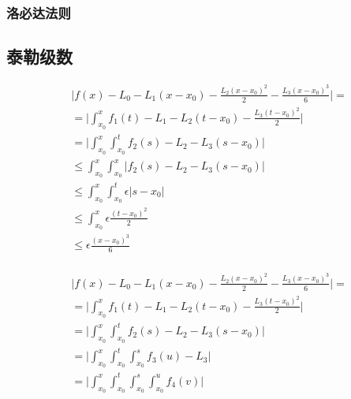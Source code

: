 \subsubsection{洛必达法则}

\subsection{泰勒级数}

\begin{align*}
    & \lvert f(x) - L_0 - L_1(x-x_0) - \frac{L_2(x-x_0)^2}{2}- \frac{L_3(x-x_0)^3}{6} \rvert = \\
    & = \lvert\int_{x_0}^{x}f_1(t) - L_1 - L_2(t-x_0) - \frac{L_3(t-x_0)^2}{2} \rvert\\ 
    & = \lvert \int_{x_0}^{x} \int_{x_0}^{t} f_2(s) - L_2 - L_3(s-x_0) \rvert \\ 
    & \le \int_{x_0}^{x} \int_{x_0}^{x} \lvert f_2(s) - L_2 - L_3(s-x_0) \rvert \\
    & \le \int_{x_0}^{x} \int_{x_0}^{t} \epsilon \lvert s-x_0 \rvert \\
    & \le \int_{x_0}^{x} \epsilon \frac{(t-x_0)^2}{2} \\
    & \le \epsilon \frac{(x-x_0)^3}{6} \\
\end{align*}

\begin{align*}
    & \lvert f(x) - L_0 - L_1(x-x_0) - \frac{L_2(x-x_0)^2}{2}- \frac{L_3(x-x_0)^3}{6} \rvert = \\
    & = \lvert\int_{x_0}^{x}f_1(t) - L_1 - L_2(t-x_0) - \frac{L_3(t-x_0)^2}{2} \rvert\\ 
    & = \lvert \int_{x_0}^{x} \int_{x_0}^{t} f_2(s) - L_2 - L_3(s-x_0) \rvert \\ 
    & = \lvert \int_{x_0}^{x} \int_{x_0}^{t} \int_{x_0}^{s} f_3(u) - L_3 \rvert \\ 
    & = \lvert \int_{x_0}^{x} \int_{x_0}^{t} \int_{x_0}^{s} \int_{x_0}^{u} f_4(v) \rvert \\ 
\end{align*}